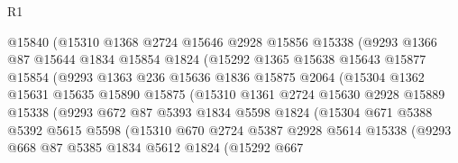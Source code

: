 \begin{lexlean}{R1}
\begin{coremodule}
                    @15840
                    (@15310
                      @1368
                      @2724
                      @15646
                      @2928
                      @15856
                      @15338
                      (@9293
                        @1366
                        @87
                        @15644
                        @1834
                        @15854
                        @1824
                        (@15292
                          @1365
                          @15638
                          @15643
                          @15877
                          @15854
                          (@9293
                            @1363
                            @236
                            @15636
                            @1836
                            @15875
                            @2064
                            (@15304
                              @1362
                              @15631
                              @15635
                              @15890
                              @15875
                              (@15310
                                @1361
                                @2724
                                @15630
                                @2928
                                @15889
                                @15338
                                (@9293
                                  @672
                                  @87
                                  @5393
                                  @1834
                                  @5598
                                  @1824
                                  (@15304
                                    @671
                                    @5388
                                    @5392
                                    @5615
                                    @5598
                                    (@15310
                                      @670
                                      @2724
                                      @5387
                                      @2928
                                      @5614
                                      @15338
                                      (@9293
                                        @668
                                        @87
                                        @5385
                                        @1834
                                        @5612
                                        @1824
                                        (@15292
                                          @667

\end{coremodule}
\end{lexlean}
